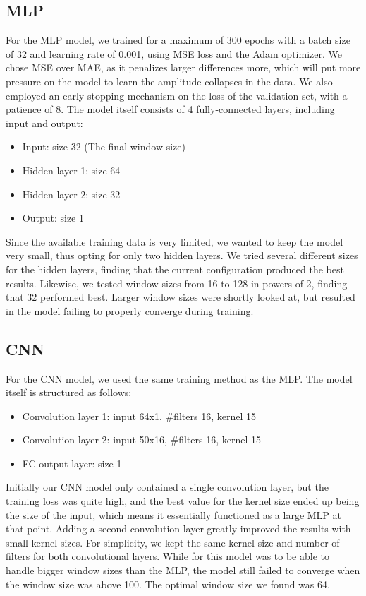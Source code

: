 \documentclass[conference]{IEEEtran}
\begin{document}
\subsection{MLP}
For the MLP model, we trained for a maximum of 300 epochs with a batch size of 32 and learning rate of 0.001, using MSE loss and the Adam optimizer. We chose MSE over MAE, as it penalizes larger differences more, which will put more pressure on the model to learn the amplitude collapses in the data. We also employed an early stopping mechanism on the loss of the validation set, with a patience of 8. The model itself consists of 4 fully-connected layers, including input and output:
\begin{itemize}
    \item Input: size 32 (The final window size)
    \item Hidden layer 1: size 64
    \item Hidden layer 2: size 32
    \item Output: size 1
\end{itemize}

Since the available training data is very limited, we wanted to keep the model very small, thus opting for only two hidden layers. We tried several different sizes for the hidden layers, finding that the current configuration produced the best results. Likewise, we tested window sizes from 16 to 128 in powers of 2, finding that 32 performed best. Larger window sizes were shortly looked at, but resulted in the model failing to properly converge during training.

\subsection{CNN}
For the CNN model, we used the same training method as the MLP. The model itself is structured as follows:
\begin{itemize}
    \item Convolution layer 1: input 64x1, \#filters 16, kernel 15
    \item Convolution layer 2: input 50x16, \#filters 16, kernel 15
    \item FC output layer: size 1
\end{itemize}
Initially our CNN model only contained a single convolution layer, but the training loss was quite high, and the best value for the kernel size ended up being the size of the input, which means it essentially functioned as a large MLP at that point. Adding a second convolution layer greatly improved the results with small kernel sizes. For simplicity, we kept the same kernel size and number of filters for both convolutional layers.
While for this model was to be able to handle bigger window sizes than the MLP, the model still failed to converge when the window size was above 100. The optimal window size we found was 64.
\end{document}
